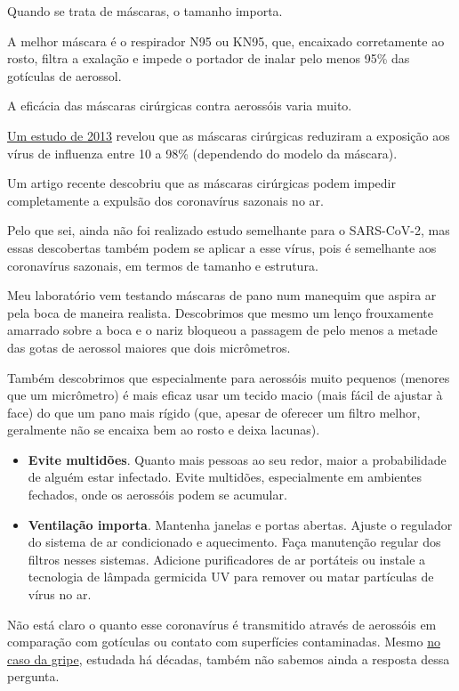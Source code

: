 Quando se trata de máscaras, o tamanho importa.

A melhor máscara é o respirador N95 ou KN95, que, encaixado corretamente
ao rosto, filtra a exalação e impede o portador de inalar pelo menos
95\% das gotículas de aerossol.

A eficácia das máscaras cirúrgicas contra aerossóis varia muito.

\href{https://pubmed.ncbi.nlm.nih.gov/23498357/}{Um estudo de 2013}
revelou que as máscaras cirúrgicas reduziram a exposição aos vírus de
influenza entre 10 a 98\% (dependendo do modelo da máscara).

Um artigo recente descobriu que as máscaras cirúrgicas podem impedir
completamente a expulsão dos coronavírus sazonais no ar.

Pelo que sei, ainda não foi realizado estudo semelhante para o
SARS-CoV-2, mas essas descobertas também podem se aplicar a esse vírus,
pois é semelhante aos coronavírus sazonais, em termos de tamanho e
estrutura.

Meu laboratório vem testando máscaras de pano num manequim que aspira ar
pela boca de maneira realista. Descobrimos que mesmo um lenço
frouxamente amarrado sobre a boca e o nariz bloqueou a passagem de pelo
menos a metade das gotas de aerossol maiores que dois micrômetros.

Também descobrimos que especialmente para aerossóis muito pequenos
(menores que um micrômetro) é mais eficaz usar um tecido macio (mais
fácil de ajustar à face) do que um pano mais rígido (que, apesar de
oferecer um filtro melhor, geralmente não se encaixa bem ao rosto e
deixa lacunas).

\begin{itemize}
\item
  \textbf{Evite multidões}. Quanto mais pessoas ao seu redor, maior a
  probabilidade de alguém estar infectado. Evite multidões,
  especialmente em ambientes fechados, onde os aerossóis podem se
  acumular.
\item
  \textbf{Ventilação importa}. Mantenha janelas e portas abertas. Ajuste
  o regulador do sistema de ar condicionado e aquecimento. Faça
  manutenção regular dos filtros nesses sistemas. Adicione purificadores
  de ar portáteis ou instale a tecnologia de lâmpada germicida UV para
  remover ou matar partículas de vírus no ar.
\end{itemize}

Não está claro o quanto esse coronavírus é transmitido através de
aerossóis em comparação com gotículas ou contato com superfícies
contaminadas. Mesmo
\href{https://journals.plos.org/plospathogens/article?id=10.1371/journal.ppat.1008704}{no
caso da gripe}, estudada há décadas, também não sabemos ainda a resposta
dessa pergunta.

